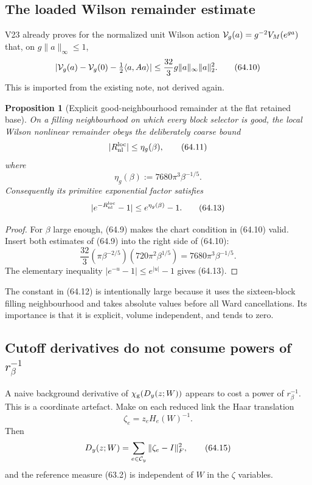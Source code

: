 \documentclass[11pt,oneside]{book}
\newtheorem{proposition}[theorem]{Proposition}
\theoremstyle{definition}
\theoremstyle{remark}
\begin{document}
\subsection{The loaded Wilson remainder estimate}

V23 already proves for the normalized unit Wilson action
\({\cal V}_g(a)=g^{-2}V_M(e^{ga})\) that, on
\(g\|a\|_\infty\le1\),
\[
 |{\cal V}_g(a)-{\cal V}_g(0)
   -\tfrac12\langle a,Aa\rangle|
 \le\frac{32}{3}g\|a\|_\infty\|a\|_2^2.                  \tag{64.10}
\]
This is imported from the existing note, not derived again.

\begin{proposition}[Explicit good-neighbourhood remainder at the
flat retained base]
\label{prop:e8v64-good-remainder}
On a filling neighbourhood on which every block selector is good,
the local Wilson nonlinear remainder obeys the deliberately coarse
bound
\[
                         |R_{\rm nl}^{\rm loc}|
                         \le\eta_g(\beta),                   \tag{64.11}
\]
where
\[
 \boxed{
 \eta_g(\beta):=7680\pi^3\beta^{-1/5}.}                     \tag{64.12}
\]
Consequently its primitive exponential factor satisfies
\[
 |e^{-R_{\rm nl}^{\rm loc}}-1|
 \le e^{\eta_g(\beta)}-1.                                  \tag{64.13}
\]
\end{proposition}

\begin{proof}
For \(\beta\) large enough, (64.9) makes the chart condition in
(64.10) valid.  Insert both estimates of (64.9) into the right side
of (64.10):
\[
 \frac{32}{3}
 (\pi\beta^{-2/5})(720\pi^2\beta^{1/5})
 =7680\pi^3\beta^{-1/5}.
\]
The elementary inequality
\(|e^{-u}-1|\le e^{|u|}-1\) gives (64.13).
\end{proof}

The constant in (64.12) is intentionally large because it uses the
sixteen-block filling neighbourhood and takes absolute values before
all Ward cancellations.  Its importance is that it is explicit,
volume independent, and tends to zero.

\subsection{Cutoff derivatives do not consume powers of
\texorpdfstring{\(r_\beta^{-1}\)}{r-beta inverse}}

A naive background derivative of
\(\chi_{\rm g}(D_y(z;W))\) appears to cost a power of
\(r_\beta^{-1}\).  This is a coordinate artefact.  Make on each
reduced link the Haar translation
\[
                         \zeta_e=z_eH_e(W)^{-1}.              \tag{64.14}
\]
Then
\[
 D_y(z;W)=\sum_{e\in{\cal C}_y}\|\zeta_e-I\|_F^2,           \tag{64.15}
\]
and the reference measure (63.2) is independent of \(W\) in the
\(\zeta\) variables.
\end{document}
